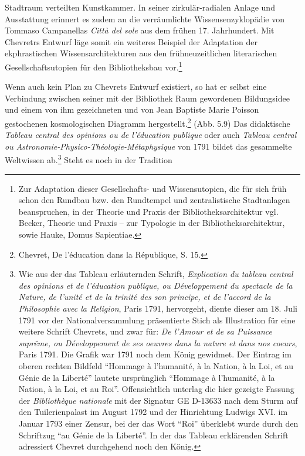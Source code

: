 Stadtraum verteilten Kunstkammer. In seiner zirkulär-radialen Anlage und
Ausstattung erinnert es zudem an die verräumlichte Wissensenzyklopädie
von Tommaso Campanellas \emph{Città del sole} aus dem frühen 17.
Jahrhundert. Mit Chevretrs Entwurf läge somit ein weiteres Beispiel der
Adaptation der ekphrastischen Wissensarchitekturen aus den
frühneuzeitlichen literarischen Gesellschaftsutopien für den
Bibliotheksbau vor.\footnote{Zur Adaptation dieser Gesellschafts- und
  Wissensutopien, die für sich früh schon den Rundbau bzw. den
  Rundtempel und zentralistische Stadtanlagen beanspruchen, in der
  Theorie und Praxis der Bibliotheksarchitektur vgl. Becker, Theorie und
  Praxis -- zur Typologie in der Bibliotheksarchitektur, sowie Hauke,
  Domus Sapientiae.}

Wenn auch kein Plan zu Chevrets Entwurf existiert, so hat er selbst eine
Verbindung zwischen seiner mit der Bibliothek Raum gewordenen
Bildungsidee und einem von ihm gezeichneten und von Jean Baptiste Marie
Poisson gestochenen kosmologischen Diagramm hergestellt.\footnote{Chevret,
  De l'éducation dans la République, S. 15.} (Abb. 5.9) Das didaktische
\emph{Tableau central des opinions ou de l'éducation publique} oder auch
\emph{Tableau central ou Astronomie-Physico-Théologie-Métaphysique} von
1791 bildet das gesammelte Weltwissen ab.\footnote{Wie aus der das
  Tableau erläuternden Schrift, \emph{Explication du tableau central des
  opinions et de l'éducation publique, ou Développement du spectacle de
  la Nature, de l'unité et de la trinité des son principe, et de
  l'accord de la Philosophie avec la Religion}, Paris 1791, hervorgeht,
  diente dieser am 18. Juli 1791 vor der Nationalversammlung
  präsentierte Stich als Illustration für eine weitere Schrift Chevrets,
  und zwar für: \emph{De l'Amour et de sa Puissance suprême, ou
  Développement de ses oeuvres dans la nature et dans nos coeurs}, Paris
  1791. Die Grafik war 1791 noch dem König gewidmet. Der Eintrag im
  oberen rechten Bildfeld \enquote{Hommage à l'humanité, à la Nation, à
  la Loi, et au Génie de la Liberté} lautete ursprünglich
  \enquote{Hommage à l'humanité, à la Nation, à la Loi, et au Roi}.
  Offensichtlich unterlag die hier gezeigte Fassung der
  \emph{Bibliothèque nationale} mit der Signatur GE D-13633 nach dem
  Sturm auf den Tuilerienpalast im August 1792 und der Hinrichtung
  Ludwigs XVI. im Januar 1793 einer Zensur, bei der das Wort
  \enquote{Roi} überklebt wurde durch den Schriftzug \enquote{au Génie
  de la Liberté}. In der das Tableau erklärenden Schrift adressiert
  Chevret durchgehend noch den König.} Steht es noch in der Tradition
